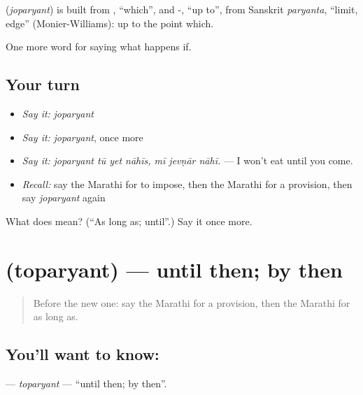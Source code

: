 \begin{cousinweb}
\textbf{} (\emph{joparyant}) is built from , \textquotedblleft{}which\textquotedblright{}, and -, \textquotedblleft{}up to\textquotedblright{}, from Sanskrit \emph{paryanta}, \textquotedblleft{}limit, edge\textquotedblright{} (Monier-Williams): up to the point which.
\end{cousinweb}

\begin{grammarlens}[title={What you've built}]
One more word for saying what happens if.
\end{grammarlens}

\subsection*{Your turn}
\begin{itemize}
\raggedright
  \item \emph{Say it:} \emph{joparyant}
  \item \emph{Say it:} \emph{joparyant}, once more
  \item \emph{Say it:} \emph{joparyant tū yet nāhīs, mī jevṇār nāhī.} — I won't eat until you come.
  \item \emph{Recall:} say the Marathi for to impose, then the Marathi for a provision, then say \emph{joparyant} again
\end{itemize}

\begin{tcolorbox}[breakable,colback=teal!4,colframe=teal!35!black,title={Before you move on}]
What does  mean? (\textquotedblleft{}As long as; until\textquotedblright{}.) Say it once more.
\end{tcolorbox}
\section[\texorpdfstring{\mr{तोपर्यंत} (toparyant)}{तोपर्यंत (toparyant)}]{ (toparyant) — until then; by then}

\label{lesson:MR-C381-toparyant}



\begin{quote}
Before the new one: say the Marathi for a provision, then the Marathi for as long as.
\end{quote}

\subsection*{You'll want to know: }
\textbf{} — \emph{toparyant} — \textquotedblleft{}until then; by then\textquotedblright{}.

